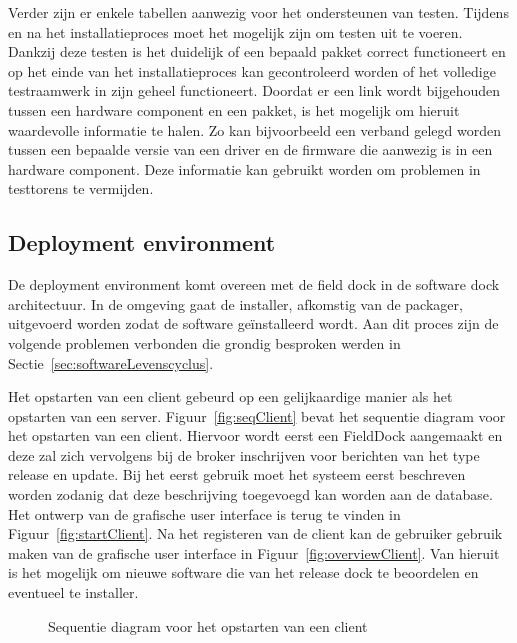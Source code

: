 Verder zijn er enkele tabellen aanwezig voor het ondersteunen van testen.
Tijdens en na het installatieproces moet het mogelijk zijn om testen uit te voeren.
Dankzij deze testen is het duidelijk of een bepaald pakket correct functioneert en op het einde van het installatieproces kan gecontroleerd worden of het volledige testraamwerk in zijn geheel functioneert.
Doordat er een link wordt bijgehouden tussen een hardware component en een pakket, is het mogelijk om hieruit waardevolle informatie te halen.
Zo kan bijvoorbeeld een verband gelegd worden tussen een bepaalde versie van een driver en de firmware die aanwezig is in een hardware component.
Deze informatie kan gebruikt worden om problemen in testtorens te vermijden.

\subsection{Deployment environment}
De deployment environment komt overeen met de field dock in de software dock architectuur.
In de omgeving gaat de installer, afkomstig van de packager, uitgevoerd worden zodat de software geïnstalleerd wordt.
Aan dit proces zijn de volgende problemen verbonden die grondig besproken werden in Sectie~\ref{sec:softwareLevenscyclus}.

Het opstarten van een client gebeurd op een gelijkaardige manier als het opstarten van een server.
Figuur~\vref{fig:seqClient} bevat het sequentie diagram voor het opstarten van een client.
Hiervoor wordt eerst een FieldDock aangemaakt en deze zal zich vervolgens bij de broker inschrijven voor berichten van het type release en update.
Bij het eerst gebruik moet het systeem eerst beschreven worden zodanig dat deze beschrijving toegevoegd kan worden aan de database.
Het ontwerp van de grafische user interface is terug te vinden in Figuur~\vref{fig:startClient}.
Na het registeren van de client kan de gebruiker gebruik maken van de grafische user interface in Figuur~\vref{fig:overviewClient}.
Van hieruit is het mogelijk om nieuwe software die van het release dock te beoordelen en eventueel te installer.

\begin{figure}[!ht]
\centering
{}
\caption{Sequentie diagram voor het opstarten van een client}
\label{fig:seqClient}
\end{figure}

